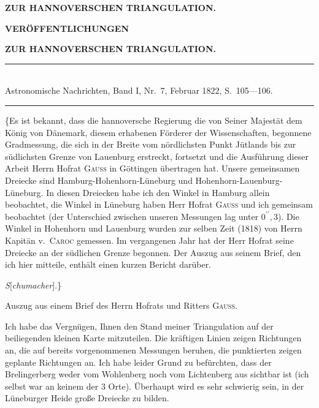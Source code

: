 \clearpage
\noindent{}\hfill{\small\textbf{ZUR HANNOVERSCHEN TRIANGULATION.}}\hfill\null\par\medskip
\begin{center}
{\large\textbf{VERÖFFENTLICHUNGEN}}\par\bigskip
{\large\textbf{ZUR HANNOVERSCHEN TRIANGULATION.}}\par\medskip
[II.]\par\bigskip
\rule{.74\linewidth}{.4pt}\\[-.5ex]
{\small Astronomische Nachrichten, Band I, Nr.~7, Februar 1822, S.~105---106.}\\[-.5ex]
\rule{.74\linewidth}{.4pt}
\end{center}
\par\noindent\hspace*{\parindent}\{Es ist bekannt, dass die hannoversche Regierung die von Seiner Majestät dem König von Dänemark, diesem erhabenen Förderer der Wissenschaften, begonnene Gradmessung, die sich in der Breite vom nördlichsten Punkt Jütlands bis zur südlichsten Grenze von Lauenburg erstreckt, fortsetzt und die Ausführung dieser Arbeit Herrn Hofrat \textsc{Gauss} in Göttingen übertragen hat. Unsere gemeinsamen Dreiecke sind Hamburg-Hohenhorn-Lüneburg und Hohenhorn-Lauenburg-Lüneburg. In diesen Dreiecken habe ich den Winkel in Hamburg allein beobachtet, die Winkel in Lüneburg haben Herr Hofrat \textsc{Gauss} und ich gemeinsam beobachtet (der Unterschied zwischen unseren Messungen lag unter \(0^{\prime\prime}{,}3\)). Die Winkel in Hohenhorn und Lauenburg wurden zur selben Zeit (1818) von Herrn Kapitän v.~\textsc{Caroc} gemessen. Im vergangenen Jahr hat der Herr Hofrat seine Dreiecke an der südlichen Grenze begonnen. Der Auszug aus seinem Brief, den ich hier mitteile, enthält einen kurzen Bericht darüber.
\par\noindent\hfill\textit{S}[\textit{chumacher}].\}\par
\begin{center}Auszug aus einem Brief des Herrn Hofrats und Ritters \textsc{Gauss}.\end{center}
\par\noindent\hspace*{\parindent}Ich habe das Vergnügen, Ihnen den Stand meiner Triangulation auf der beiliegenden kleinen Karte mitzuteilen. Die kräftigen Linien zeigen Richtungen an, die auf bereits vorgenommenen Messungen beruhen, die punktierten zeigen geplante Richtungen an. Ich habe leider Grund zu befürchten, dass der Brelingerberg weder vom Wohlenberg noch vom Lichtenberg aus sichtbar ist (ich selbst war an keinem der 3 Orte). Überhaupt wird es sehr schwierig sein, in der Lüneburger Heide große Dreiecke zu bilden.

